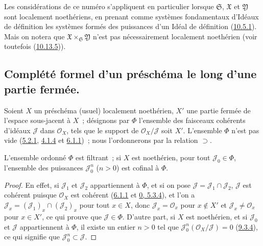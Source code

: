 \begin{env}[10.7.4]
Les considérations de ce numéro s'appliquent en particulier lorsque
$\mathfrak{S}$, $\mathfrak{X}$ et $\mathfrak{Y}$ sont localement
noethériens, en prenant comme systèmes fondamentaux d'Idéaux de définition
les systèmes formés des puissances d'un Idéal de définition
(\hyperref[I.10.5.1-fr]{10.5.1}). Mais on notera que
$\mathfrak{X}\times_{\mathfrak{S}}\mathfrak{Y}$ n'est pas nécessairement
localement noethérien (voir toutefois
(\hyperref[I.10.13.5-fr]{10.13.5})).
\end{env}

\subsection{Complété formel d'un préschéma le long d'une partie fermée.}
\label{subsection:I.10.8-fr}

\begin{env}[10.8.1]
\label{I.10.8.1-fr}
Soient $X$ un préschéma (usuel) localement noethérien, $X'$ une partie
fermée de l'espace sous-jacent à $X$~; désignons par $\Phi$ l'ensemble des
faisceaux cohérents d'idéaux $\mathscr{J}$ dans $\mathscr{O}_X$, tels que
le support de $\mathscr{O}_X/\mathscr{J}$ soit $X'$. L'ensemble $\Phi$
n'est pas vide (\hyperref[I.5.2.1-fr]{5.2.1},
\hyperref[I.4.1.4-fr]{4.1.4} et
\hyperref[I.6.1.1-fr]{6.1.1})~; nous l'ordonnerons par la relation
$\supset$.
\end{env}

\begin{lemma}[10.8.2]
\label{I.10.8.2-fr}
L'ensemble ordonné $\Phi$ est filtrant~; si $X$ est noethérien, pour tout
$\mathscr{J}_0\in\Phi$, l'ensemble des puissances
$\mathscr{J}_0^n$ ($n>0$) est cofinal à $\Phi$.
\end{lemma}

\begin{proof}
En effet, si $\mathscr{J}_1$ et $\mathscr{J}_2$ appartiennent à $\Phi$, et
si on pose $\mathscr{J}=\mathscr{J}_1\cap\mathscr{J}_2$,
$\mathscr{J}$ est cohérent puisque $\mathscr{O}_X$ est cohérent
(\hyperref[I.6.1.1-fr]{6.1.1} et
\hyperref[0.5.3.4-fr]{0, 5.3.4}), et l'on a
$\mathscr{J}_x=(\mathscr{J}_1)_x\cap(\mathscr{J}_2)_x$ pour tout
$x\in X$, donc $\mathscr{J}_x=\mathscr{O}_x$ pour $x\notin X'$ et
$\mathscr{J}_x\neq\mathscr{O}_x$ pour $x\in X'$, ce qui prouve que
$\mathscr{J}\in\Phi$. D'autre part, si $X$ est noethérien, et si
$\mathscr{J}_0$ et $\mathscr{J}$ appartiennent à $\Phi$, il existe un
entier $n>0$ tel que
$\mathscr{J}_0^n(\mathscr{O}_X/\mathscr{J})=0$
(\hyperref[I.9.3.4-fr]{9.3.4}), ce qui signifie que
$\mathscr{J}_0^n\subset\mathscr{J}$.
\end{proof}

